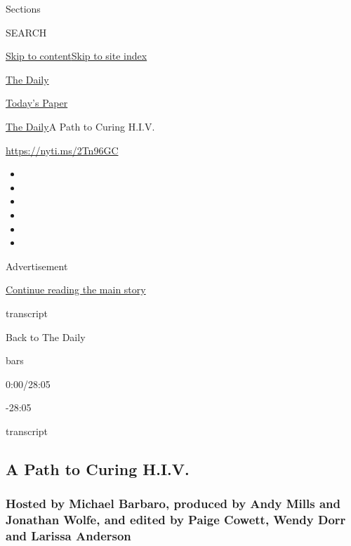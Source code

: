 Sections

SEARCH

\protect\hyperlink{site-content}{Skip to
content}\protect\hyperlink{site-index}{Skip to site index}

\href{https://www.nytimes.com/podcasts/the-daily}{The Daily}

\href{https://myaccount.nytimes.com/auth/login?response_type=cookie\&client_id=vi}{}

\href{https://www.nytimes.com/section/todayspaper}{Today's Paper}

\href{/podcasts/the-daily}{The Daily}\textbar{}A Path to Curing H.I.V.

\href{https://nyti.ms/2Tn96GC}{https://nyti.ms/2Tn96GC}

\begin{itemize}
\item
\item
\item
\item
\item
\item
\end{itemize}

Advertisement

\protect\hyperlink{after-top}{Continue reading the main story}

transcript

Back to The Daily

bars

0:00/28:05

-28:05

transcript

\hypertarget{a-path-to-curing-hiv}{%
\subsection{A Path to Curing H.I.V.}\label{a-path-to-curing-hiv}}

\hypertarget{hosted-by-michael-barbaro-produced-by-andy-mills-and-jonathan-wolfe-and-edited-by-paige-cowett-wendy-dorr-and-larissa-anderson}{%
\subsubsection{Hosted by Michael Barbaro, produced by Andy Mills and
Jonathan Wolfe, and edited by Paige Cowett, Wendy Dorr and Larissa
Anderson}\label{hosted-by-michael-barbaro-produced-by-andy-mills-and-jonathan-wolfe-and-edited-by-paige-cowett-wendy-dorr-and-larissa-anderson}}

